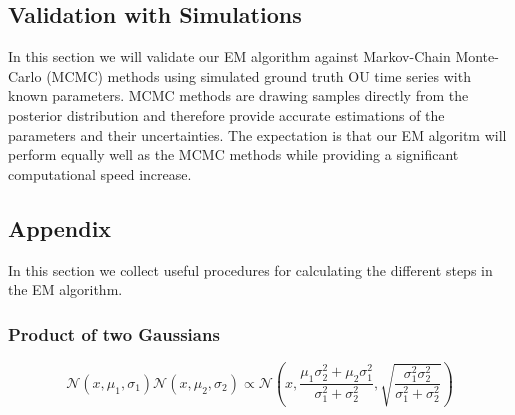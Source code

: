 \documentclass[%
 reprint,
 amsmath,amssymb,
 aps,
]{revtex4-1}
\begin{document}
\subsection{Validation with Simulations}
In this section we will validate our EM algorithm against Markov-Chain Monte-Carlo (MCMC) methods using simulated ground truth OU time series with known parameters. MCMC methods are drawing samples directly from the posterior distribution and therefore provide accurate estimations of the parameters and their uncertainties.  The expectation is that our EM algoritm will perform equally well as the MCMC methods while providing a significant computational speed increase.
\begin{figure}[H]
\begin{center}
\caption{}\label{fig:multitau}
\end{center}
\end{figure}

\subsection{Appendix}
In this section we collect useful procedures for calculating the different steps in the EM algorithm.
\subsubsection{Product of two Gaussians}
\begin{equation}
\mathcal{N}(x,\mu_{1},\sigma_{1})\mathcal{N}(x,\mu_{2},\sigma_{2}) 
\propto \mathcal{N}\left(x,\frac{\mu_{1}\sigma_{2}^{2}+\mu_{2}\sigma_{1}^{2}}{\sigma_{1}^2+\sigma_{2}^2},\sqrt{\frac{\sigma_{1}^2\sigma_{2}^2}{\sigma_{1}^2+\sigma_{2}^2}}\right)
\end{equation}
\end{document}
